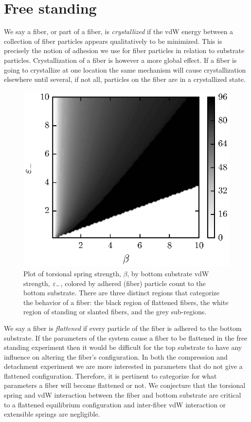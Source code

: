 \section{Free standing}

We say a fiber, or part of a fiber, is \textit{crystallized} if the vdW energy between a collection of fiber particles appears qualitatively to be minimized. This is precisely the notion of adhesion we use for fiber particles in relation to substrate particles. Crystallization of a fiber is however a more global effect. If a fiber is going to crystallize at one location the same mechanism will cause crystallization elsewhere until several, if not all, particles on the fiber are in a crystallized state. 

	\begin{figure}[ht!]
		\begin{center}
			\includegraphics{./fig/ch3/fs/grid.eps}
		\end{center}		
		\caption{Plot of torsional spring strength, $\beta$, by bottom substrate vdW strength, $\varepsilon_-$, colored by adhered (fiber) particle count to the bottom substrate. There are three distinct regions that categorize the behavior of a fiber: the black region of flattened fibers, the white region of standing or slanted fibers, and the grey sub-regions.
		\label{fig:fs}}
	\end{figure}

We say a fiber is \textit{flattened} if every particle of the fiber is adhered to the bottom substrate. If the parameters of the system cause a fiber to be flattened in the free standing experiment then it would be difficult for the top substrate to have any influence on altering the fiber's configuration. In both the compression and detachment experiment we are more interested in parameters that do not give a flattened configuration. Therefore, it is pertinent to categorize for what parameters a fiber will become flattened or not. We conjecture that the torsional spring and vdW interaction between the fiber and bottom substrate are critical to a flattened equilibrium configuration and inter-fiber vdW interaction or extensible springs are negligible.

